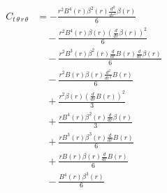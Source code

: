 \documentclass[11pt,a4paper]{article}
\begin{document}
\begin{align*}
  C_{t\,\theta\,r\,\theta} &= - \frac{r^{2} B^{4}{\left(r \right)} \beta^{2}{\left(r \right)} \frac{d^{2}}{d r^{2}} \beta{\left(r \right)}}{6} \\
  &\quad - \frac{r^{2} B^{4}{\left(r \right)} \beta{\left(r \right)} \left(\frac{d}{d r} \beta{\left(r \right)}\right)^{2}}{6} \\
  &\quad - \frac{r^{2} B^{3}{\left(r \right)} \beta^{2}{\left(r \right)} \frac{d}{d r} B{\left(r \right)} \frac{d}{d r} \beta{\left(r \right)}}{6} \\
  &\quad - \frac{r^{2} B{\left(r \right)} \beta{\left(r \right)} \frac{d^{2}}{d r^{2}} B{\left(r \right)}}{6} \\
  &\quad + \frac{r^{2} \beta{\left(r \right)} \left(\frac{d}{d r} B{\left(r \right)}\right)^{2}}{3} \\
  &\quad + \frac{r B^{4}{\left(r \right)} \beta^{2}{\left(r \right)} \frac{d}{d r} \beta{\left(r \right)}}{3} \\
  &\quad + \frac{r B^{3}{\left(r \right)} \beta^{3}{\left(r \right)} \frac{d}{d r} B{\left(r \right)}}{6} \\
  &\quad + \frac{r B{\left(r \right)} \beta{\left(r \right)} \frac{d}{d r} B{\left(r \right)}}{6} \\
  &\quad - \frac{B^{4}{\left(r \right)} \beta^{3}{\left(r \right)}}{6}
\end{align*}
\end{document}
